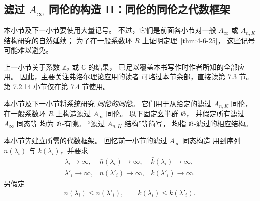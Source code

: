 
\subsection{滤过 $A_\infty$ 同伦的构造 II：同伦的同伦之代数框架}
\label{subsec:7-2-12}

本小节及下一小节要使用大量记号。
不过，它们是前面各小节对一般
$A_\infty$ 或 $A_{n,K}$ 结构研究的自然延续；
为了在一般系数环 $R$ 上证明定理~\ref{thm:4-6-25}，
这些记号可能难以避免。

上一小节关于系数 $\mathbb Z_2$ 或 $\mathbb C$ 的结果，
已足以覆盖本书写作时作者所知的全部应用。
因此，主要关注弗洛尔理论应用的读者
可略过本节余部，直接读第 7.3 节。
第 7.2.14 小节仅在第 7.4 节使用。

本小节及下一小节将系统研究
\emph{同伦的同伦}。
它们用于从给定的滤过 $A_{n,K}$ 同伦，
在一般系数环 $R$ 上构造滤过 $A_\infty$ 同伦。
以下固定幺半群 $\mathfrak G$，
并假定所有滤过 $A_\infty$ 同态等
均为 $\mathfrak G$-有隙。
“滤过 $A_{n,K}$ 结构”等简写，
均指 $\mathfrak G$-滤过的相应结构。

本小节先建立所需的代数框架。
回忆前一小节的滤过 $A_\infty$ 同态构造
用到序列 $\bar n(\lambda_i)$ 与
$\bar k(\lambda_i)$，并要求
\[
\begin{array}{lll}
\lambda_i\to\infty,&
\bar n(\lambda_i)\to\infty,&
\bar k(\lambda_i)\to\infty,\\
\lambda'_i\to\infty,&
\bar n(\lambda'_i)\to\infty,&
\bar k(\lambda'_i)\to\infty.
\end{array}
\]
另假定
\[
\bar n(\lambda_i)\le\bar n(\lambda'_i),
\qquad
\bar k(\lambda_i)\le\bar k(\lambda'_i).
\]

